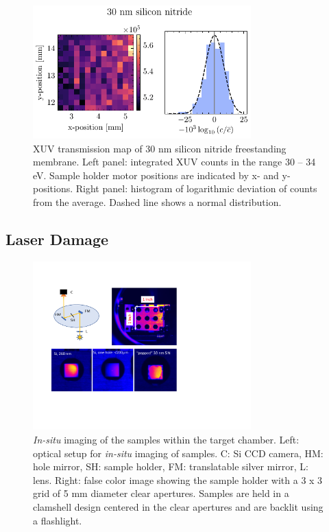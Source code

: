 \begin{figure}
	\centering
	\includegraphics[width=0.75\textwidth]{figures/chap4/nitride_map.pdf}
	\caption{XUV transmission map of 30 nm silicon nitride freestanding membrane. Left panel: integrated XUV counts in the range 30 -- 34 eV. Sample holder motor positions are indicated by x- and y-positions. Right panel: histogram of logarithmic deviation of counts from the average. Dashed line shows a normal distribution.}
	\label{fig:nitride_map}
\end{figure}

\subsection{Laser Damage}
\label{sec:laser_damage}

\begin{figure}
	\centering
	\includegraphics[width=0.75\textwidth]{figures/chap4/sample_holder_damage.pdf}
	\caption{\textit{In-situ} imaging of the samples within the target chamber. Left: optical setup for \textit{in-situ} imaging of samples. C: Si CCD camera, HM: hole mirror, SH: sample holder, FM: translatable silver mirror, L: lens. Right: false color image showing the sample holder with a 3 x 3 grid of 5 mm diameter clear apertures. Samples are held in a clamshell design centered in the clear apertures and are backlit using a flashlight.}
	\label{fig:sample_holder_damage}
\end{figure}

